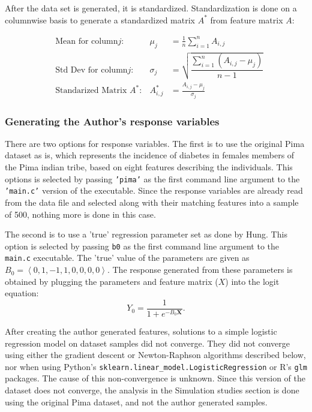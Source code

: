\documentclass{article}
\begin{document}
After the data set is generated, it is standardized. Standardization is done on a columnwise basis to generate a standardized matrix $A^*$ from feature matrix $A$:

\begin{align*}
&\text{Mean for column} j:& \mu_j &= \frac{1}{n}\sum_{i=1}^{n} A_{i,j}\\
&\text{Std Dev for column} j:& \sigma_j &= \sqrt{\dfrac{\sum_{i=1}^n \left(A_{i,j} - \mu_j\right)}{n-1}}\\
&\text{Standarized Matrix}\,\, A^*:& A^*_{i,j} &= \frac{A_{i,j} - \mu_j}{\sigma_j}
\end{align*}

\subsubsection*{Generating the Author's response variables}

There are two options for response variables. The first is to use the original Pima dataset as is, which represents the incidence of diabetes in females members of the Pima indian tribe, based on eight features describing the individuals. This options is selected by passing \texttt{'pima'} as the first command line argument to the \texttt{'main.c'} version of the executable. Since the response variables are already read from the data file and selected along with their matching features into a sample of 500, nothing more is done in this case. 

The second is to use a 'true' regression parameter set as done by Hung. This option is selected by passing \texttt{b0} as the first command line argument to the \texttt{main.c} executable. The 'true' value of the parameters are given as $B_0 = \left<0,1,-1,1,0,0,0,0\right>$. The response generated from these parameters is obtained by plugging the parameters and feature matrix ($X$) into the logit equation:
\[Y_0 = \frac{1}{1+e^{-B_0\mathbf{X}}}.\]

After creating the author generated features, solutions to a simple logistic regression model on dataset samples did not converge. They did not converge using either the gradient descent or Newton-Raphson algorithms described below, nor when using Python's \texttt{sklearn.linear\_model.LogisticRegression} or R's \texttt{glm} packages. The cause of this non-convergence is unknown. Since this version of the dataset does not converge, the analysis in the Simulation studies section is done using the original Pima dataset, and not the author generated samples.
\end{document}
